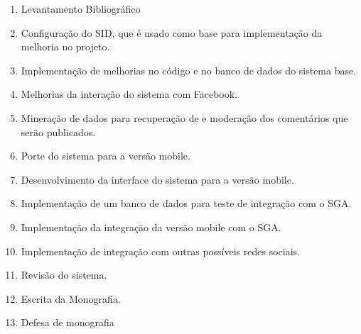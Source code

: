 \documentclass[
	12pt,				%
	openright,			%
	oneside,			%
	a4paper,			%
	english,			%
	french,				%
	spanish,			%
	brazil,				%
	]{abntex2}
\begin{document}
	\begin{enumerate}[label=\Roman*)]
	\item Levantamento Bibliográfico
	
	\item Configuração do SID, que é usado como base para implementação da melhoria no projeto.
	
	\item Implementação de melhorias no código e no banco de dados do sistema base.
	
	\item Melhorias da interação do sistema com Facebook.
	
	\item Mineração de dados para recuperação de e moderação dos comentários que serão publicados.
	
	\item Porte do sistema para a versão mobile.
	
	\item Desenvolvimento da interface do sistema para a versão mobile.
	
	\item Implementação de um banco de dados para teste de integração com o SGA.
	
	\item Implementação da integração da versão mobile com o SGA.
	
	\item Implementação de integração com outras possíveis redes sociais.
	
	\item Revisão do sistema.
	
	\item Escrita da Monografia.
	
	\item Defesa de monografia
	
	\end{enumerate}
\end{document}

